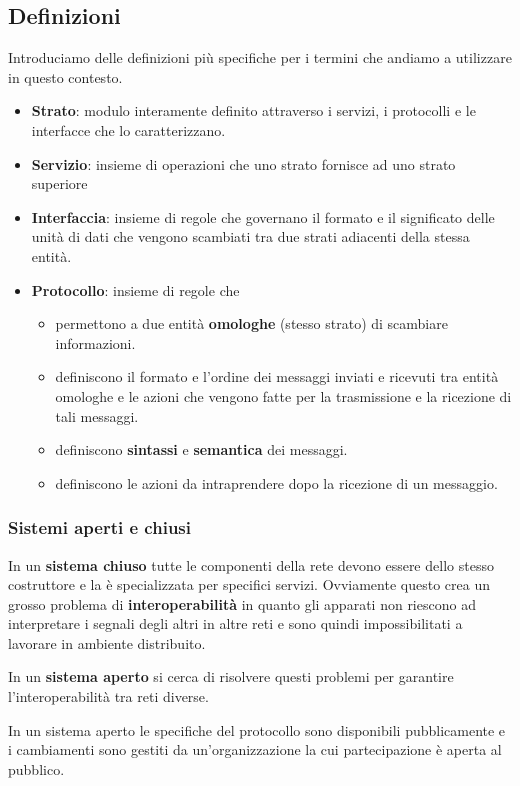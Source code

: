 \subsection{Definizioni}
Introduciamo delle definizioni più specifiche per i termini che andiamo
a utilizzare in questo contesto.
\begin{itemize}
	\item \textbf{Strato}: modulo interamente definito attraverso i 
		servizi, i protocolli e le interfacce che lo caratterizzano.
	\item \textbf{Servizio}: insieme di operazioni che uno strato 
		fornisce ad uno strato superiore
	\item \textbf{Interfaccia}: insieme di regole che governano il
		formato e il significato delle unità di dati che vengono
		scambiati tra due strati adiacenti della stessa entità.
	\item \textbf{Protocollo}: insieme di regole che
		\begin{itemize}
			\item permettono a due entità \textbf{omologhe} (stesso 
				strato) di scambiare informazioni.
			\item definiscono il formato e l'ordine dei messaggi 
				inviati e ricevuti tra entità omologhe e le azioni che
				vengono fatte per la trasmissione e la ricezione di 
				tali messaggi.
			\item definiscono \textbf{sintassi} e \textbf{semantica} 
				dei messaggi.
			\item definiscono le azioni da intraprendere dopo la 
				ricezione di un messaggio.
		\end{itemize}
\end{itemize}

\subsubsection{Sistemi aperti e chiusi}
In un \textbf{sistema chiuso} tutte le componenti della rete devono 
essere dello stesso costruttore e la è specializzata per specifici 
servizi. Ovviamente questo crea un grosso problema di 
\textbf{interoperabilità} in quanto gli apparati non riescono ad 
interpretare i segnali degli altri in altre reti e sono quindi 
impossibilitati a lavorare in ambiente distribuito.

In un \textbf{sistema aperto} si cerca di risolvere questi problemi 
per garantire l'interoperabilità tra reti diverse.

In un sistema aperto le specifiche del protocollo sono disponibili 
pubblicamente e i cambiamenti sono gestiti da un'organizzazione la cui 
partecipazione è aperta al pubblico.

